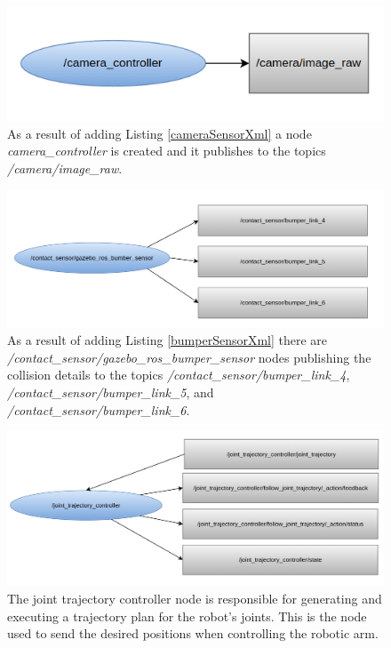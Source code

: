 \documentclass[12pt,oneside]{article}
\begin{document}
\begin{figure}[H]
\centering
\includegraphics[width=0.95\linewidth]{rosgraph02_new}
\caption[The camera\_controller node.]{As a result of adding Listing \ref{cameraSensorXml} a node \textit{camera\_controller} is created and it publishes to the topics \textit{/camera/image\_raw}.}
\label{fig:rosgraph02}
\end{figure}

\begin{figure}[H]
\centering
\includegraphics[width=0.95\linewidth]{rosgraph03_new}
\caption[The /contact\_sensor/gazebo\_ros\_bumper\_sensor node.]{As a result of adding Listing \ref{bumperSensorXml} there are \textit{/contact\_sensor/gazebo\_ros\_bumper\_sensor} nodes publishing the collision details to the topics \textit{/contact\_sensor/bumper\_link\_4}, \textit{/contact\_sensor/bumper\_link\_5}, and\textit{ /contact\_sensor/bumper\_link\_6}. }
\label{fig:rosgraph03}
\end{figure}

\begin{figure}[H]
\centering
\includegraphics[width=0.95\linewidth]{rosgraph04_new}
\caption[The /joint\_trajectory\_controller node.]{The joint trajectory controller node is responsible for generating and executing a trajectory plan for the robot's joints. This is the node used to send the desired positions when controlling the robotic arm.}
\label{fig:rosgraph04}
\end{figure}
\end{document}
